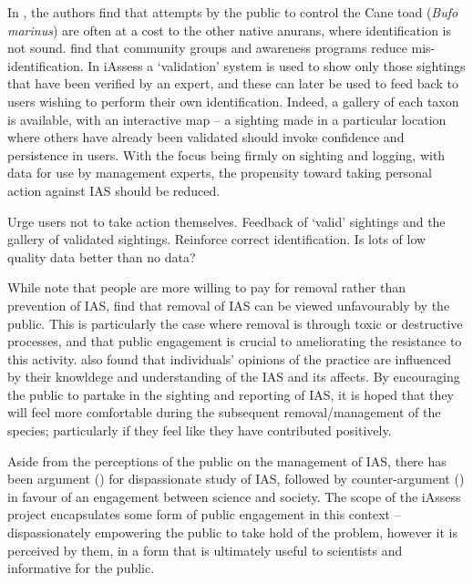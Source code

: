 \documentclass[10pt,psfig,letterpaper,twocolumn]{article}
\begin{document}
In \cite{Somaweera:2010p44168}, the authors find that attempts by the public to control the Cane toad (\emph{Bufo marinus}) are often at a cost to the other native anurans, where identification is not sound. \cite{Somaweera:2010p44168} find that community groups and awareness programs reduce mis-identification. In iAssess a `validation' system is used to show only those sightings that have been verified by an expert, and these can later be used to feed back to users wishing to perform their own identification. Indeed, a gallery of each taxon is available, with an interactive map -- a sighting made in a particular location where others have already been validated should invoke confidence and persistence in users. With the focus being firmly on sighting and logging, with data for use by management experts, the propensity toward taking personal action against IAS should be reduced. 

 Urge users not to take action themselves. Feedback of `valid' sightings and the gallery of validated sightings. Reinforce correct identification.
Is lots of low quality data better than no data?

While \cite{GarciaLlorente:2011p44211} note that people are more willing to pay for removal rather than prevention of IAS, \cite{Sharp:2011p43812} find that removal of IAS can be viewed unfavourably by the public. This is particularly the case where removal is through toxic or destructive processes, and that public engagement is crucial to ameliorating the resistance to this activity. \cite{GarciaLlorente:2011p44211} also found that individuals' opinions of the practice are influenced by their knowldege and understanding of the IAS and its affects. By encouraging the public to partake in the sighting and reporting of IAS, it is hoped that they will feel more comfortable during the subsequent removal/management of the species; particularly if they feel like they have contributed positively. 

Aside from the perceptions of the public on the management of IAS, there has been argument (\cite{BrownSax:2004}) for dispassionate study of IAS, followed by counter-argument (\cite{Larson:2007p44160}) in favour of an engagement between science and society. The scope of the iAssess project encapsulates some form of public engagement in this context -- dispassionately empowering the public to take hold of the problem, however it is perceived by them, in a form that is ultimately useful to scientists and informative for the public.

\section*{}
\end{document}
